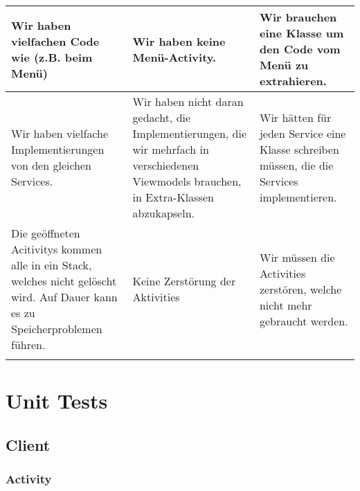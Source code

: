 \documentclass[a4paper]{scrreprt}
\begin{document}
\begin{flushleft}
\begin{longtable}{|p{}|p{}|p{}|}
\hline

{Wir haben vielfachen Code wie (z.B. beim Menü)} & {Wir haben keine Menü-Activity.} & {Wir brauchen eine Klasse um den Code vom Menü zu extrahieren.} \\

\hline

{Wir haben vielfache Implementierungen von den gleichen Services.} & {Wir haben nicht daran gedacht, die Implementierungen, die wir mehrfach in verschiedenen Viewmodels brauchen, in Extra-Klassen abzukapseln.} & {Wir hätten für jeden Service eine Klasse schreiben müssen, die die Services implementieren.} \\


\hline

{Die geöffneten Acitivitys kommen alle in ein Stack, welches nicht gelöscht wird. Auf Dauer kann es zu Speicherproblemen führen.} & {Keine Zerstörung der Aktivities } & {Wir müssen die Activities zerstören, welche nicht mehr gebraucht werden.} \\

\hline

{} & {} & {} \\

\hline
		\end{longtable}
	\end{flushleft}	
	
	\chapter{Unit Tests}
	\section{Client}
	\subsection{Activity}
\end{document}
